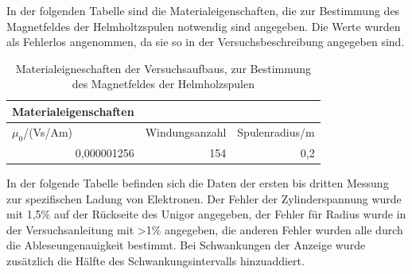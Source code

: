 \documentclass[12pt,a4paper]{article}
\begin{document}
In der folgenden Tabelle sind die Materialeigenschaften, die zur Bestimmung des Magnetfeldes der Helmholtzspulen notwendig sind angegeben. Die Werte wurden als Fehlerlos angenommen, da sie so in der Versuchsbeschreibung angegeben sind.

\begin{table}[H]
\caption{Materialeigneschaften der Versuchsaufbaus, zur Bestimmung des Magnetfeldes der Helmholzspulen}
\begin{center}
\begin{tabular}{|l|l|l|}
\hline
Materialeigenschaften &  &  \\ \hline
$\mu_0$/(Vs/Am) & Windungsanzahl & Spulenradius/m \\ \hline
\multicolumn{1}{|r|}{0,000001256} & \multicolumn{1}{r|}{154} & \multicolumn{1}{r|}{0,2} \\ \hline
\end{tabular}
\end{center}
\label{tab:1_m}
\end{table}

In der folgende Tabelle befinden sich die Daten der ersten bis dritten Messung zur spezifischen Ladung von Elektronen. Der Fehler der Zylinderspannung wurde mit 1,5\% auf der Rückseite des Unigor angegeben, der Fehler für Radius wurde in der Versuchsanleitung mit >1\% angegeben, die anderen Fehler wurden alle durch die Ableseungenauigkeit bestimmt. Bei Schwankungen der Anzeige wurde zusätzlich die Hälfte des Schwankungsintervalls hinzuaddiert.
\end{document}
